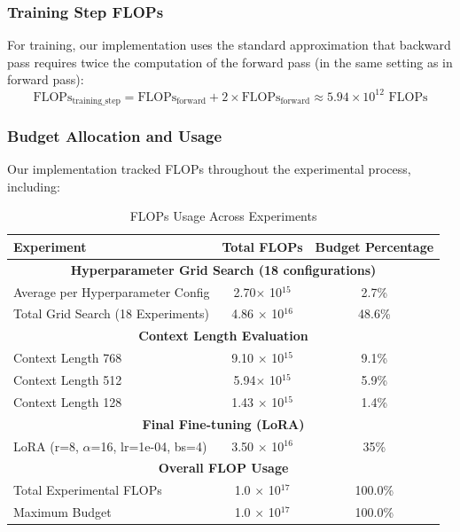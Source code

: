 \documentclass{article}
\begin{document}
\subsubsection*{Training Step FLOPs}

For training, our implementation uses the standard approximation that backward pass requires twice the computation of the forward pass (in the same setting as in forward pass):
\begin{equation}
\text{FLOPs}_{\text{training\_step}} = \text{FLOPs}_{\text{forward}} + 2 \times \text{FLOPs}_{\text{forward}} \approx 5.94 \times 10^{12} \text{ FLOPs}
\end{equation}

\subsubsection*{Budget Allocation and Usage}

Our implementation tracked FLOPs throughout the experimental process, including:
\begin{table}[H]
    \centering
    \begin{tabular}{lcc}
    \hline
    \textbf{Experiment} & \textbf{Total FLOPs} & \textbf{Budget Percentage} \\
    \hline
    \multicolumn{3}{c}{\textbf{Hyperparameter Grid Search (18 configurations)}} \\
    \hline
    Average per Hyperparameter Config & 2.70$\times$ 10$^{15}$ & 2.7\% \\
    Total Grid Search (18 Experiments) & 4.86 $\times$ 10$^{16}$ & 48.6\% \\
    \hline
    \multicolumn{3}{c}{\textbf{Context Length Evaluation}} \\
    \hline
    Context Length 768 & 9.10 $\times$ 10$^{15}$ & 9.1\% \\
    Context Length 512 & 5.94$\times$ 10$^{15}$ & 5.9\% \\
    Context Length 128 & 1.43 $\times$ 10$^{15}$ & 1.4\% \\
    \hline
    \multicolumn{3}{c}{\textbf{Final Fine-tuning (LoRA)}} \\
    \hline
    LoRA (r=8, $\alpha$=16, lr=1e-04, bs=4) & 3.50 $\times$ 10$^{16}$ & 35\% \\
    \hline
    \multicolumn{3}{c}{\textbf{Overall FLOP Usage}} \\
    \hline
    Total Experimental FLOPs & 1.0 $\times$ 10$^{17}$ & 100.0\% \\
    Maximum Budget & 1.0 $\times$ 10$^{17}$ & 100.0\% \\
    \hline
    \end{tabular}
    \caption{FLOPs Usage Across Experiments}
    \label{tab:flops_usage}
    \end{table}
    



\end{document}
